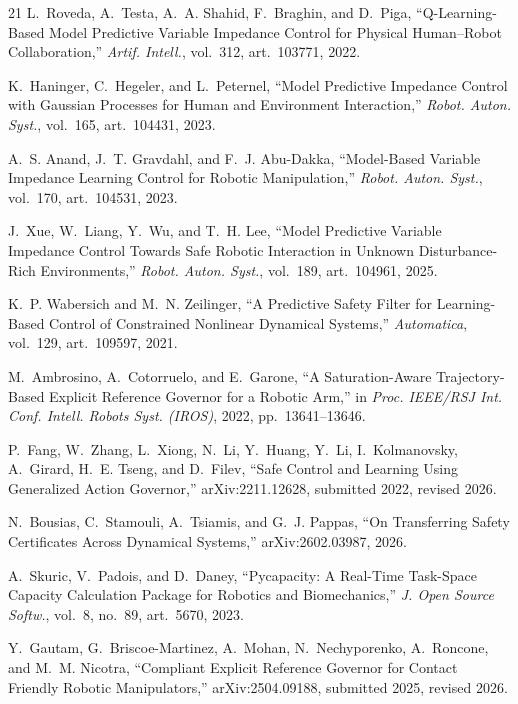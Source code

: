 \documentclass[journal]{IEEEtran}
\begin{document}
\begin{thebibliography}{21}
 L.~Roveda, A.~Testa, A.~A. Shahid, F.~Braghin, and D.~Piga, ``Q-Learning-Based Model Predictive Variable Impedance Control for Physical Human--Robot Collaboration,'' \emph{Artif. Intell.}, vol.~312, art.~103771, 2022.

 K.~Haninger, C.~Hegeler, and L.~Peternel, ``Model Predictive Impedance Control with Gaussian Processes for Human and Environment Interaction,'' \emph{Robot. Auton. Syst.}, vol.~165, art.~104431, 2023.

 A.~S. Anand, J.~T. Gravdahl, and F.~J. Abu-Dakka, ``Model-Based Variable Impedance Learning Control for Robotic Manipulation,'' \emph{Robot. Auton. Syst.}, vol.~170, art.~104531, 2023.

 J.~Xue, W.~Liang, Y.~Wu, and T.~H. Lee, ``Model Predictive Variable Impedance Control Towards Safe Robotic Interaction in Unknown Disturbance-Rich Environments,'' \emph{Robot. Auton. Syst.}, vol.~189, art.~104961, 2025.

 K.~P. Wabersich and M.~N. Zeilinger, ``A Predictive Safety Filter for Learning-Based Control of Constrained Nonlinear Dynamical Systems,'' \emph{Automatica}, vol.~129, art.~109597, 2021.

 M.~Ambrosino, A.~Cotorruelo, and E.~Garone, ``A Saturation-Aware Trajectory-Based Explicit Reference Governor for a Robotic Arm,'' in \emph{Proc. IEEE/RSJ Int. Conf. Intell. Robots Syst. (IROS)}, 2022, pp.~13641--13646.

 P.~Fang, W.~Zhang, L.~Xiong, N.~Li, Y.~Huang, Y.~Li, I.~Kolmanovsky, A.~Girard, H.~E. Tseng, and D.~Filev, ``Safe Control and Learning Using Generalized Action Governor,'' arXiv:2211.12628, submitted 2022, revised 2026.

 N.~Bousias, C.~Stamouli, A.~Tsiamis, and G.~J. Pappas, ``On Transferring Safety Certificates Across Dynamical Systems,'' arXiv:2602.03987, 2026.

 A.~Skuric, V.~Padois, and D.~Daney, ``Pycapacity: A Real-Time Task-Space Capacity Calculation Package for Robotics and Biomechanics,'' \emph{J. Open Source Softw.}, vol.~8, no.~89, art.~5670, 2023.

 Y.~Gautam, G.~Briscoe-Martinez, A.~Mohan, N.~Nechyporenko, A.~Roncone, and M.~M. Nicotra, ``Compliant Explicit Reference Governor for Contact Friendly Robotic Manipulators,'' arXiv:2504.09188, submitted 2025, revised 2026.

\end{thebibliography}
\end{document}
